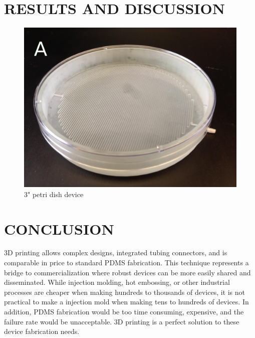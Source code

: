 \documentclass{article}
\begin{document}
\section{RESULTS AND DISCUSSION}



\begin{figure}[h!]
\centering
\includegraphics[scale=0.2]{3-inch-well-photo.png}
\caption{3" petri dish device}
\label{fig:3-inch-well-photo}
\end{figure}

\section{CONCLUSION}

3D printing allows complex designs, integrated tubing connectors, and is comparable in price to standard PDMS fabrication.
This technique represents a bridge to commercialization where robust devices can be more easily shared and disseminated.
While injection molding, hot embossing, or other industrial processes are cheaper when making hundreds to thousands of devices, it is not practical to make a injection mold when making tens to hundreds of devices.
In addition, PDMS fabrication would be too time consuming, expensive, and the failure rate would be unacceptable.
3D printing is a perfect solution to these device fabrication needs.



\end{document}
